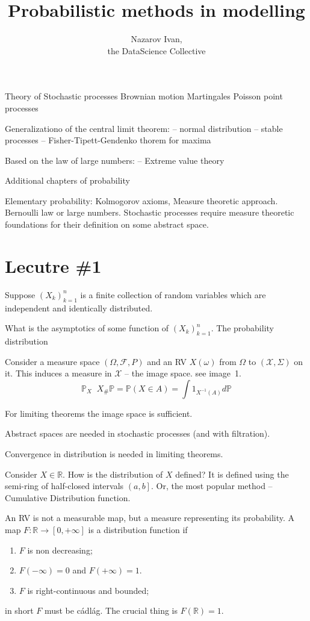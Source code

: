 \documentclass[a4paper]{article}
\title{Probabilistic methods in modelling}
\author{Nazarov Ivan, \rus{101мНОД(ИССА)}\\the DataScience Collective}
\newcommand{\clo}[1]{{\left [ #1 \right ]}}
\newcommand{\ploc}[1]{{\left ( #1 \right ]}}
\newcommand{\brac}[1]{{\left ( #1 \right )}}
\newcommand{\Real}{\mathbb{R}}
\newcommand{\Fcal}{\mathcal{F}}
\newcommand{\defn}{\mathop{\overset{\Delta}{=}}\nolimits}
\begin{document}
\maketitle

Theory of Stochastic processes
Brownian motion
Martingales
Poisson point processes

Generalizationo of the central limit theorem:
-- normal distribution
-- stable processes
-- Fisher-Tipett-Gendenko thorem for maxima

Based on the law of large numbers:
-- Extreme value theory

Additional chapters of probability

Elementary probability: Kolmogorov axioms, Measure theoretic approach.
Bernoulli law or large numbers.
Stochastic processes require measure theoretic foundations for their definition on some abstract space.

\section{Lecutre \#1} %
\label{sec:lecutre_1}


Suppose $\brac{X_k}_{k=1}^n$ is a finite collection of random variables which are independent and identically distributed.

What is the asymptotics of some function of $\brac{X_k}_{k=1}^n$. The probability distribution 

Consider a measure space $(\Omega, \Fcal, P)$ and an RV $X(\omega)$ from $\Omega$ to $(\mathcal{X}, \Sigma)$ on it.
This induces a measure in $\mathcal{X}$ -- the image space. see image~1.
\[\mathbb{P}_X \defn X_\# \mathbb{P} = \mathbb{P}\brac{X\in A} = \int 1_{X^{-1}(A)}d\mathbb{P}\]

For limiting theorems the image space is sufficient.

Abstract spaces are needed in stochastic processes (and with filtration).

Convergence in distribution is needed in limiting theorems.

Consider $X\in \Real$.
How is the distribution of $X$ defined?
It is defined using the semi-ring of half-closed intervals $\ploc{a,b}$.
Or, the most popular method -- Cumulative Distribution function.

An RV is not a measurable map, but a measure representing its probability.
A map $F:\Real\to \clo{0,+\infty}$ is a distribution function if \begin{enumerate}
	\item $F$ is non decreasing;
	\item $F(-\infty) = 0$ and $F(+\infty) = 1$.
	\item $F$ is right-continuous and bounded;
\end{enumerate}
in short $F$ must be c\'adl\'ag. The crucial thing is $F(\Real)=1$.
\end{document}
